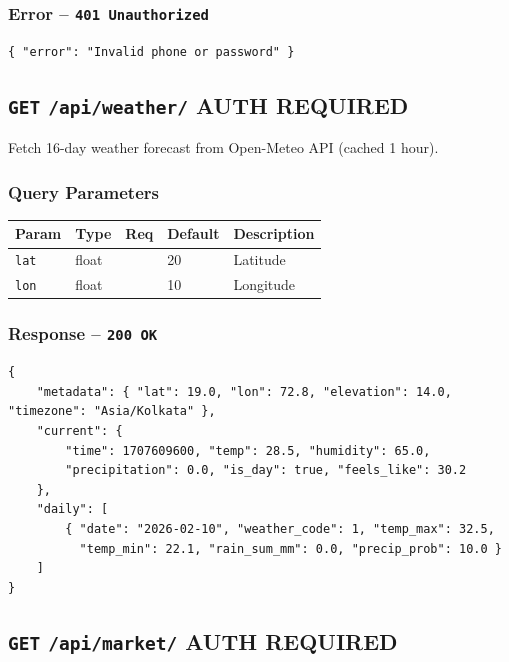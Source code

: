 \documentclass[11pt,a4paper]{article}
\newcommand{\authbadge}{\textcolor{lockgold}{\textbf{AUTH REQUIRED}}}
\newcommand{\httpmethod}[1]{\texttt{\textbf{#1}}}
\begin{document}
\subsubsection*{Error -- \texttt{401 Unauthorized}}
\begin{lstlisting}[style=jsonStyle]
{ "error": "Invalid phone or password" }
\end{lstlisting}

\subsection{\httpmethod{GET} \texttt{/api/weather/} \hfill \authbadge}

Fetch 16-day weather forecast from Open-Meteo API (cached 1 hour).

\subsubsection*{Query Parameters}

\begin{table}[H]
\centering
\begin{tabular}{l l c l l}
\toprule
\textbf{Param} & \textbf{Type} & \textbf{Req} & \textbf{Default} & \textbf{Description} \\
\midrule
\texttt{lat} & float & & 20 & Latitude \\
\texttt{lon} & float & & 10 & Longitude \\
\bottomrule
\end{tabular}
\end{table}

\subsubsection*{Response -- \texttt{200 OK}}
\begin{lstlisting}[style=jsonStyle]
{
    "metadata": { "lat": 19.0, "lon": 72.8, "elevation": 14.0, "timezone": "Asia/Kolkata" },
    "current": {
        "time": 1707609600, "temp": 28.5, "humidity": 65.0,
        "precipitation": 0.0, "is_day": true, "feels_like": 30.2
    },
    "daily": [
        { "date": "2026-02-10", "weather_code": 1, "temp_max": 32.5,
          "temp_min": 22.1, "rain_sum_mm": 0.0, "precip_prob": 10.0 }
    ]
}
\end{lstlisting}

\subsection{\httpmethod{GET} \texttt{/api/market/} \hfill \authbadge}
\end{document}

